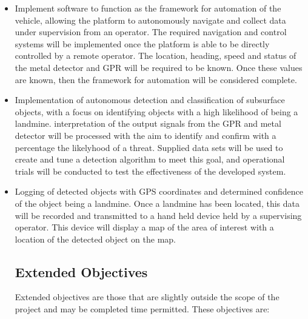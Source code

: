 \documentclass[main.tex]{subfiles}
\begin{document}
\begin{itemize}
\item Implement software to function as the framework for automation of the vehicle, allowing the platform to autonomously navigate and collect data under supervision from an operator. 
The required navigation and control systems will be implemented once the platform is able to be directly controlled by a remote operator. The location, heading, speed and status of the metal detector and GPR will be required to be known. Once these values are known, then the framework for automation will be considered complete.

\item Implementation of autonomous detection and classification of subsurface objects, with a focus on identifying objects with a high likelihood of being a landmine. 
interpretation of the output signals from the GPR and metal detector will be processed with the aim to identify and confirm with a percentage the likelyhood of a threat. %
Supplied data sets will be used to create and tune a detection algorithm to meet this goal, and operational trials will be conducted to test the effectiveness of the developed system.
\item Logging of detected objects with GPS coordinates and determined confidence of the object being a landmine. Once a landmine has been located, this data will be recorded and transmitted to a hand held device held by a supervising operator. This device will display a map of the area of interest with a location of the detected object on the map.

\subsection{Extended Objectives}
Extended objectives are those that are slightly outside the scope of the project and may be completed time permitted. These objectives are:


\end{itemize}
\end{document}
